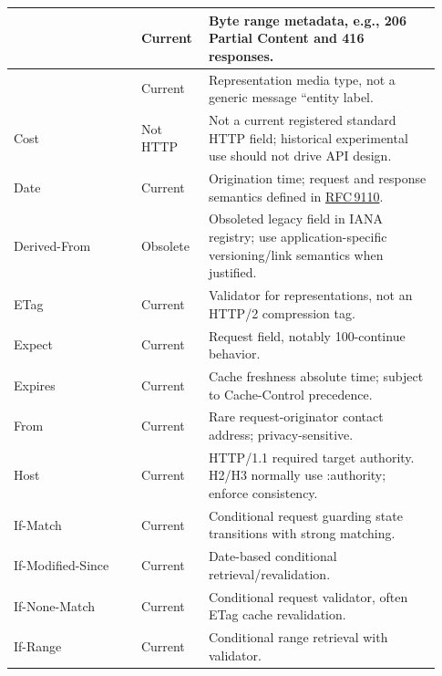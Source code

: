 \documentclass[10pt,letterpaper,oneside]{article}
\newcommand{\rf}[1]{\href{https://www.rfc-editor.org/rfc/rfc#1.html}{RFC\,#1}}
\begin{document}
\begin{longtable}{>{\RaggedRight\arraybackslash}p{0.29\linewidth}>{\RaggedRight\arraybackslash}p{0.13\linewidth}>{\RaggedRight\arraybackslash}p{0.51\linewidth}}
{\ttfamily\color{Deep}Content-\allowbreak{}Range} & {\sffamily\scriptsize Current} & Byte range metadata, e.g., 206 Partial Content and 416 responses. \\ \midrule
{\ttfamily\color{Deep}Content-\allowbreak{}Type} & {\sffamily\scriptsize Current} & Representation media type, not a generic message ``entity label. \\ \midrule
{\ttfamily\color{Deep}Cost} & {\sffamily\scriptsize Not HTTP} & Not a current registered standard HTTP field; historical experimental use should not drive API design. \\ \midrule
{\ttfamily\color{Deep}Date} & {\sffamily\scriptsize Current} & Origination time; request and response semantics defined in \rf{9110}. \\ \midrule
{\ttfamily\color{Deep}Derived-\allowbreak{}From} & {\sffamily\scriptsize Obsolete} & Obsoleted legacy field in IANA registry; use application-specific versioning/link semantics when justified. \\ \midrule
{\ttfamily\color{Deep}ETag} & {\sffamily\scriptsize Current} & Validator for representations, not an HTTP/2 compression tag. \\ \midrule
{\ttfamily\color{Deep}Expect} & {\sffamily\scriptsize Current} & Request field, notably 100-continue behavior. \\ \midrule
{\ttfamily\color{Deep}Expires} & {\sffamily\scriptsize Current} & Cache freshness absolute time; subject to Cache-Control precedence. \\ \midrule
{\ttfamily\color{Deep}From} & {\sffamily\scriptsize Current} & Rare request-originator contact address; privacy-sensitive. \\ \midrule
{\ttfamily\color{Deep}Host} & {\sffamily\scriptsize Current} & HTTP/1.1 required target authority. H2/H3 normally use :authority; enforce consistency. \\ \midrule
{\ttfamily\color{Deep}If-\allowbreak{}Match} & {\sffamily\scriptsize Current} & Conditional request guarding state transitions with strong matching. \\ \midrule
{\ttfamily\color{Deep}If-\allowbreak{}Modified-\allowbreak{}Since} & {\sffamily\scriptsize Current} & Date-based conditional retrieval/revalidation. \\ \midrule
{\ttfamily\color{Deep}If-\allowbreak{}None-\allowbreak{}Match} & {\sffamily\scriptsize Current} & Conditional request validator, often ETag cache revalidation. \\ \midrule
{\ttfamily\color{Deep}If-\allowbreak{}Range} & {\sffamily\scriptsize Current} & Conditional range retrieval with validator. \\ \midrule

\end{longtable}
\end{document}
